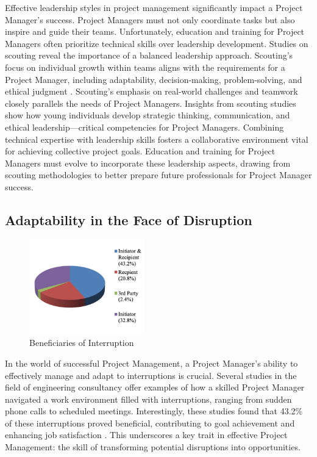 \documentclass{article}
\begin{document}
Effective leadership styles in project management significantly impact a Project Manager's success. Project Managers must not only coordinate tasks but also inspire and guide their teams. Unfortunately, education and training for Project Managers often prioritize technical skills over leadership development. Studies on scouting reveal the importance of a balanced leadership approach. Scouting's focus on individual growth within teams aligns with the requirements for a Project Manager, including adaptability, decision-making, problem-solving, and ethical judgment \cite{kaluzny2022scouting}. Scouting's emphasis on real-world challenges and teamwork closely parallels the needs of Project Managers. Insights from scouting studies show how young individuals develop strategic thinking, communication, and ethical leadership—critical competencies for Project Managers. Combining technical expertise with leadership skills fosters a collaborative environment vital for achieving collective project goals. Education and training for Project Managers must evolve to incorporate these leadership aspects, drawing from scouting methodologies to better prepare future professionals for Project Manager success.

\subsection{Adaptability in the Face of Disruption}

\begin{figure}[htp]
    \centering
    \includegraphics[width=5cm]{Beneficiaries of Interruption.png}
    \caption{Beneficiaries of Interruption}
    \label{fig:Beneficiaries of Interruption}
\end{figure}

In the world of successful Project Management, a Project Manager's ability to effectively manage and adapt to interruptions is crucial. Several studies in the field of engineering consultancy offer examples of how a skilled Project Manager navigated a work environment filled with interruptions, ranging from sudden phone calls to scheduled meetings. Interestingly, these studies found that 43.2\% of these interruptions proved beneficial, contributing to goal achievement and enhancing job satisfaction \cite{mordu2016managing}. This underscores a key trait in effective Project Management: the skill of transforming potential disruptions into opportunities.
\end{document}

